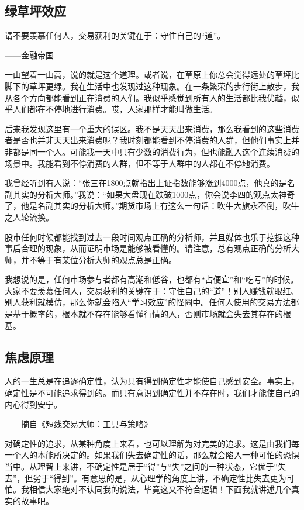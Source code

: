 \subsection{绿草坪效应}

{\kaishu
请不要羡慕任何人，交易获利的关键在于：守住自己的“道”。

\hfill ——金融帝国
}

一山望着一山高，说的就是这个道理。或者说，在草原上你总会觉得远处的草坪比脚下的草坪更绿。我在生活中也发现过这种现象。在一条繁荣的步行街上散步，我从各个方向都能看到正在消费的人们。我似乎感觉到所有人的生活都比我优越，似乎人们都在不停地进行消费。哎，人家那样才能叫做生活。

后来我发现这里有一个重大的误区。我不是天天出来消费，那么我看到的这些消费者是否也并非天天出来消费呢？我时刻都能看到不停消费的人群，但他们事实上并非都是同一个人。可能我一天中只有少数的消费行为，但也能融入这个连续消费的场景中。我能看到不停消费的人群，但不等于人群中的人都在不停地消费。

我曾经听到有人说：“张三在1800点就指出上证指数能够涨到4000点，他真的是名副其实的分析大师。”我说：“如果大盘现在跌破1000点，你会说李四的观点太神奇了，他是名副其实的分析大师。”期货市场上有这么一句话：吹牛大旗永不倒，吹牛之人轮流换。

股市任何时候都能找到过去一段时间观点正确的分析师，并且媒体也乐于挖掘这种事后合理的现象，从而证明市场是能够被看懂的。请注意，总有观点正确的分析大师，并不等于有某位分析大师的观点总是正确。

我想说的是，任何市场参与者都有高潮和低谷，也都有“占便宜”和“吃亏”的时候。大家不要羡慕任何人，交易获利的关键在于：守住自己的“道”！别人赚钱就眼红、别人获利就模仿，那么你就会陷入“学习效应”的怪圈中。任何人使用的交易方法都是基于概率的，根本就不存在能够看懂行情的人，否则市场就会失去其存在的根基。

\subsection{焦虑原理}

{\kaishu
人的一生总是在追逐确定性，认为只有得到确定性才能使自己感到安全。事实上，确定性是不可能追求得到的。而只有意识到确定性并不存在时，我们才能使自己的内心得到安宁。

\hfill ——摘自《短线交易大师：工具与策略》
}

对确定性的追求，从某种角度上来看，也可以理解为对完美的追求。这是由我们每一个人的本能所决定的。如果我们失去确定性的话，那么就会陷入一种可怕的恐惧当中。从理智上来讲，不确定性是居于“得”与“失”之间的一种状态，它优于“失去”，但劣于“得到”。有意思的是，从心理学的角度上讲，不确定性比失去更为可怕。我相信大家绝对不认同我的说法，毕竟这又不符合逻辑！下面我就讲述几个真实的故事吧。

